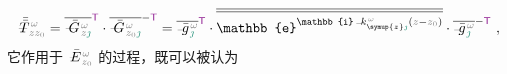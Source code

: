 \begin{align} \label{eq:transition_matrix}
	\Xint{\mathcolor{gray}{-}}{32}{\bar{\bar{T}}}^{\;\!\mathcolor{gray}{\omega}}_{\;\! \mathcolor{gray}{z} \mathcolor{gray}{z_0}} = \overline{\Xint{\mathcolor{gray}{-}}{20}{\bar{G}}^{\;\!\mathcolor{gray}{\omega}}_{\;\! \mathcolor{gray}{z} \textcolor{PineGreen}{\jmath}}}^{\mathsf{\textcolor{Plum}{T}}} \cdot \overline{\Xint{\mathcolor{gray}{-}}{20}{\bar{G}}^{\;\!\mathcolor{gray}{\omega}}_{\;\! \mathcolor{gray}{z_0} \textcolor{PineGreen}{\jmath}}}^{-\mathsf{\textcolor{Plum}{T}}} = \overline{\Xint{{}^{}_{\mathcolor{gray}{-}}}{10}{\bar{g}}^{\;\!\mathcolor{gray}{\omega}}_{\;\! \textcolor{PineGreen}{\jmath}}}^{\mathsf{\textcolor{Plum}{T}}} \cdot \overline{\overline{\mathbb{e}^{\mathbb{i} \Xint{\begin{smallmatrix} ~ \\ {}^{}_{\mathcolor{gray}{-}} \\ ~ \end{smallmatrix}}{15}{k}_{\symup{z} \textcolor{PineGreen}{\jmath}}^{\;\! \mathcolor{gray}{\omega}} \left( \mathcolor{gray}{z} - \mathcolor{gray}{z_0} \right)}}} \cdot \overline{\Xint{{}^{}_{\mathcolor{gray}{-}}}{10}{\bar{g}}^{\;\!\mathcolor{gray}{\omega}}_{\;\! \textcolor{PineGreen}{\jmath}}}^{-\mathsf{\textcolor{Plum}{T}}} ~,
\end{align}
它作用于 $\Xint{\mathcolor{gray}{-}}{25}{\bar{E}}^{\;\!\mathcolor{gray}{\omega}}_{\;\! \mathcolor{gray}{z_0}}$ 的过程，既可以被认为
